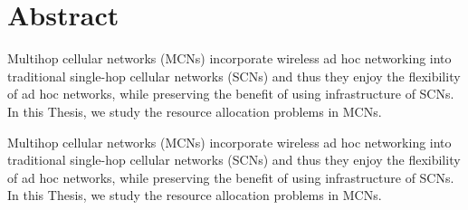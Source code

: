 \chapter*{Abstract}
\begingroup
\justifying
\setlength{\parindent}{0pt}
\setlength{\parskip}{0.5\baselineskip}

Multihop cellular networks (MCNs) incorporate wireless ad hoc networking into traditional single-hop cellular networks (SCNs) and thus they enjoy the flexibility of ad hoc networks, while preserving the benefit of using infrastructure of SCNs. In this Thesis, we study the resource allocation problems in MCNs.

Multihop cellular networks (MCNs) incorporate wireless ad hoc networking into traditional single-hop cellular networks (SCNs) and thus they enjoy the flexibility of ad hoc networks, while preserving the benefit of using infrastructure of SCNs. In this Thesis, we study the resource allocation problems in MCNs.

\endgroup